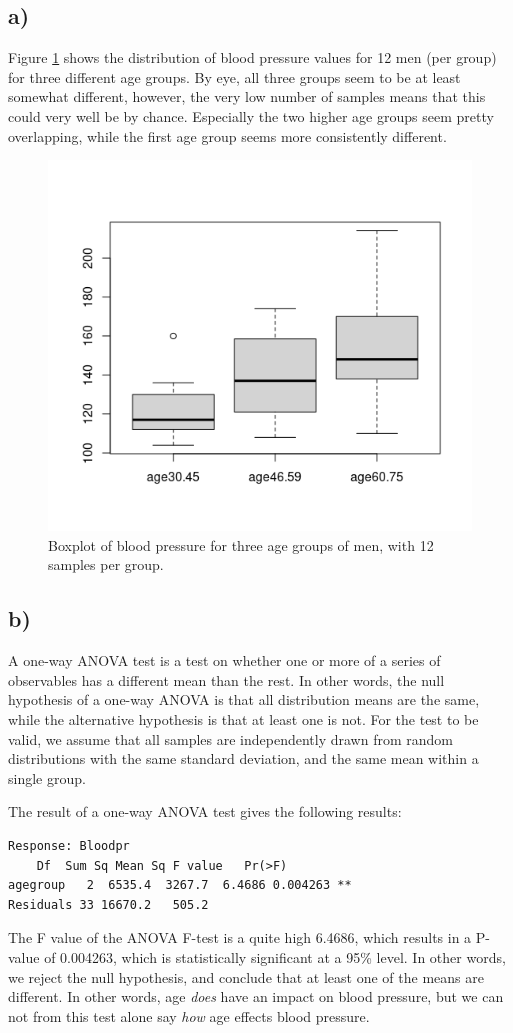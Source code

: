 \documentclass[a4paper, twocolumn]{article}
\begin{document}
\subsection*{a)}
Figure \ref{fig:blood_boxplot} shows the distribution of blood pressure values for 12 men (per group) for three different age groups. By eye, all three groups seem to be at least somewhat different, however, the very low number of samples means that this could very well be by chance. Especially the two higher age groups seem pretty overlapping, while the first age group seems more consistently different.
\begin{figure}[h!]
    \centering
    \includegraphics[width=0.7\linewidth]{figures/blood_boxplot.png}
    \caption{Boxplot of blood pressure for three age groups of men, with 12 samples per group.}
    \label{fig:blood_boxplot}
\end{figure}

\subsection*{b)}
A one-way ANOVA test is a test on whether one or more of a series of observables has a different mean than the rest. In other words, the null hypothesis of a one-way ANOVA is that all distribution means are the same, while the alternative hypothesis is that at least one is not. For the test to be valid, we assume that all samples are independently drawn from random distributions with the same standard deviation, and the same mean within a single group.

The result of a one-way ANOVA test gives the following results:
\begin{Verbatim}[fontsize=\small]
    Response: Bloodpr
    Df  Sum Sq Mean Sq F value   Pr(>F)   
agegroup   2  6535.4  3267.7  6.4686 0.004263 **
Residuals 33 16670.2   505.2                   
\end{Verbatim}
The F value of the ANOVA F-test is a quite high 6.4686, which results in a P-value of 0.004263, which is statistically significant at a 95\% level. In other words, we reject the null hypothesis, and conclude that at least one of the means are different. In other words, age \textit{does} have an impact on blood pressure, but we can not from this test alone say \textit{how} age effects blood pressure.
\end{document}
